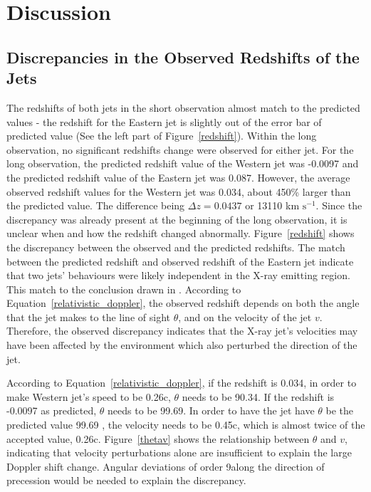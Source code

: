 \chapter{Discussion}

\section{Discrepancies in the Observed Redshifts of the Jets}
The redshifts of both jets in the short observation almost match to the predicted values - the redshift for the Eastern jet is slightly out of the error bar of predicted value (See the left part of Figure~\ref{redshift}).
Within the long observation, no significant redshifts change were observed for either jet. For the long observation, the predicted redshift value of the Western jet was -0.0097 and the predicted redshift value of the Eastern jet was 0.087. However, the average observed redshift values for the Western jet was 0.034, about 450\% larger than the predicted value. The difference being $\Delta z = 0.0437$ or 13110 km $\mathrm{s^{-1}}$. Since the discrepancy was already present at the beginning of the long observation, it is unclear when and how the redshift changed abnormally. Figure~\ref{redshift} shows the discrepancy between the observed and the predicted redshifts. The match between the predicted redshift and observed redshift of the Eastern jet indicate that two jets' behaviours were likely independent in the X-ray emitting region. This match to the conclusion drawn in \cite{Marshall2013}. According to Equation~\ref{relativistic_doppler}, the observed redshift depends on both the angle that the jet makes to the line of sight $\theta$, and on the velocity of the jet $v$. Therefore, the observed discrepancy indicates that the X-ray jet's velocities may have been affected by the environment which also perturbed the direction of the jet. 

According to Equation~\ref{relativistic_doppler}, if the redshift is 0.034, in order to make Western jet's speed to be 0.26c, $\theta$ needs to be 90.34\degree. If the redshift is -0.0097 as predicted, $\theta$ needs to be 99.69\degree. In order to have the jet have $\theta$ be the predicted value 99.69 \degree, the velocity needs to be 0.45c, which is almost twice of the accepted value, 0.26c. Figure~\ref{thetav} shows the relationship between $\theta$ and $v$, indicating that velocity perturbations alone are insufficient to explain the large Doppler shift change. Angular deviations of order 9\degree along the direction of precession would be needed to explain the discrepancy.


